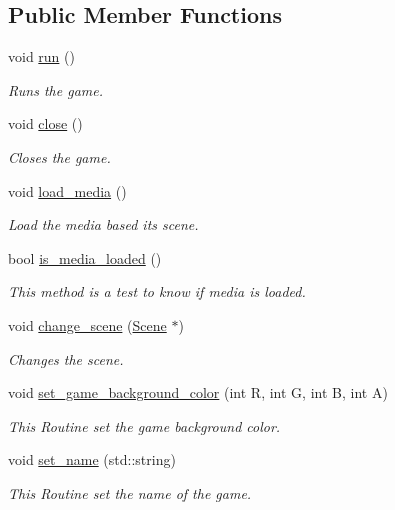 \subsection*{Public Member Functions}
\begin{DoxyCompactItemize}
\item 
void \hyperlink{classengine_1_1_game_a1ab78f5ed0d5ea879157357cf2fb2afa}{run} ()
\begin{DoxyCompactList}\small\item\em Runs the game. \end{DoxyCompactList}\item 
void \hyperlink{classengine_1_1_game_ad5133caa8447aadf71d6ba6c20d552bd}{close} ()
\begin{DoxyCompactList}\small\item\em Closes the game. \end{DoxyCompactList}\item 
void \hyperlink{classengine_1_1_game_a9d568f24b1fc461968892659f64a53ca}{load\+\_\+media} ()
\begin{DoxyCompactList}\small\item\em Load the media based its scene. \end{DoxyCompactList}\item 
bool \hyperlink{classengine_1_1_game_a1c0e0ff94cfbe6f74cfff0633628ae95}{is\+\_\+media\+\_\+loaded} ()
\begin{DoxyCompactList}\small\item\em This method is a test to know if media is loaded. \end{DoxyCompactList}\item 
void \hyperlink{classengine_1_1_game_a241b7b4944e35a4a1fe5435107fbaf65}{change\+\_\+scene} (\hyperlink{classengine_1_1_scene}{Scene} $\ast$)
\begin{DoxyCompactList}\small\item\em Changes the scene. \end{DoxyCompactList}\item 
void \hyperlink{classengine_1_1_game_a355c2dcd99a84c813fc89b8d01c3d72b}{set\+\_\+game\+\_\+background\+\_\+color} (int R, int G, int B, int A)
\begin{DoxyCompactList}\small\item\em This Routine set the game background color. \end{DoxyCompactList}\item 
void \hyperlink{classengine_1_1_game_a7dd41abdb2a4d0c72f328e1035b2cd06}{set\+\_\+name} (std\+::string)
\begin{DoxyCompactList}\small\item\em This Routine set the name of the game. \end{DoxyCompactList}\item 

\end{DoxyCompactItemize}
